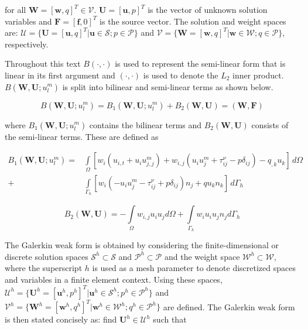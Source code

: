 \noindent for all $\bm{W}=[\mathbf{w},q]^T \in \bm{\mathcal{V}}$.
$\bm{U}=[\mathbf{u},p]^T$ is the vector of unknown solution variables
and $\bm{F}=[\mathbf{f},0]^T$ is the source vector.
The solution and weight spaces are:
$\bm{\mathcal{U}} = \{\bm{U}=[\mathbf{u},q]^T | \mathbf{u} \in 
\bm{\mathcal{S}}; p \in \mathcal{P}\}$ and
$\bm{\mathcal{V}} = \{\bm{W}=[\mathbf{w},q]^T | \mathbf{w} \in
\bm{\mathcal{W}}; q \in \mathcal{P}\}$, respectively.

Throughout this text $B(\cdot,\cdot)$ is used to represent the semi-linear
form that is linear in its first argument and $(\cdot,\cdot)$ is used to denote the $L_2$
inner product.
$B(\bm{W},\bm{U};u^m_l)$ is split into bilinear and semi-linear terms as shown below. 

\begin{equation}
B(\bm{W},\bm{U};u^m_l) = B_1(\bm{W},\bm{U};u^m_l) + B_2(\bm{W}, \bm{U}) = (\bm{W},\bm{F})
\end{equation}

\noindent where $B_1(\bm{W},\bm{U};u^m_l)$ contains the bilinear terms and $B_2(\bm{W}, \bm{U})$ consists of the semi-linear terms. These are defined as

\begin{equation}
\begin{split}
B_1(\bm{W},\bm{U};u^m_l)  =& \int\limits_\Omega [w_i (u_{i,t} + u_i u^m_{j,j}) + w_{i,j} (u_i u^m_j + \tau^{\nu}_{ij} - p \delta_{ij}) -q_{,k} u_k] \, d\Omega \\
      +& \int\limits_{\Gamma_h} [w_i (-u_i u^m_j -\tau^{\nu}_{ij} + p \delta_{ij}) n_j + q u_k n_k] \, d\Gamma_h 
\end{split}
\end{equation}

\begin{equation}
B_2(\bm{W},\bm{U})  = -\int\limits_\Omega w_{i,j} u_i u_j d\Omega +\int\limits_{\Gamma_h} w_i u_i u_j n_j d\Gamma_h 
\end{equation}



The Galerkin weak form is obtained by considering
the finite-dimensional or discrete solution spaces
$\bm{\mathcal{S}}^h \subset \bm{\mathcal{S}}$ and
$\mathcal{P}^h \subset \mathcal{P}$ and the weight
space $\bm{\mathcal{W}}^h \subset \bm{\mathcal{W}}$, where
the superscript $h$ is used as a mesh parameter to denote discretized spaces and variables in a finite element context.
Using these spaces, $\bm{\mathcal{U}}^h =
\{ \bm{U}^h=[\mathbf{u}^h,p^h]^T | \mathbf{u}^h \in \bm{\mathcal{S}}^h; p^h \in \mathcal{P}^h \}$ and $\bm{\mathcal{V}}^h =
\{ \bm{W}^h=[\mathbf{w}^h,q^h]^T | \mathbf{w}^h \in \bm{\mathcal{W}}^h; q^h \in \mathcal{P}^h \}$ are defined.
The Galerkin weak form is then stated concisely as:
find $\bm{U}^h \in \bm{\mathcal{U}}^h$ such that

